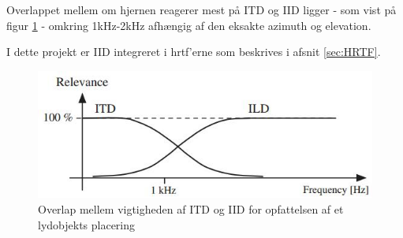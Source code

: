 Overlappet mellem om hjernen reagerer mest på ITD og IID ligger - som vist på figur \ref{fig:itdiid} - omkring 1kHz-2kHz  afhængig af den eksakte azimuth og elevation.

I dette projekt er IID integreret i hrtf'erne som beskrives i afsnit \ref{sec:HRTF}.

\begin{figure}
	\centering
	\includegraphics[width=0.7\linewidth]{All_Pics/ITDIID}
	\caption{Overlap mellem vigtigheden af ITD og IID for opfattelsen af et lydobjekts placering \cite{SpatialBook}}
	\label{fig:itdiid}
\end{figure}
